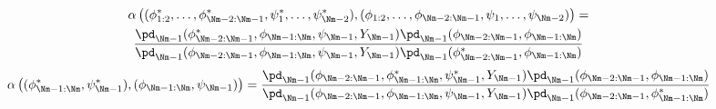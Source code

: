 \begin{multline}
  \alpha\left(
    (\phi_{1:2}^{*}, \ldots, \phi_{\Nm - 2:\Nm - 1}^{*}, \psi_{1}^{*}, \ldots, \psi_{\Nm - 2}^{*}),
    (\phi_{1:2}, \ldots, \phi_{\Nm - 2:\Nm - 1}, \psi_{1}, \ldots, \psi_{\Nm - 2})
  \right)
  = \\
  \frac {
    \pd_{\Nm - 1}(\phi_{\Nm - 2:\Nm - 1}^{*}, \phi_{\Nm - 1:\Nm}, \psi_{\Nm - 1}, Y_{\Nm - 1})
    \pd_{\Nm - 1}(\phi_{\Nm - 2:\Nm - 1}, \phi_{\Nm - 1:\Nm})
  } {
    \pd_{\Nm - 1}(\phi_{\Nm - 2:\Nm - 1}, \phi_{\Nm - 1:\Nm}, \psi_{\Nm - 1}, Y_{\Nm - 1})
    \pd_{\Nm - 1}(\phi_{\Nm - 2:\Nm - 1}^{*}, \phi_{\Nm - 1:\Nm})
  } 
  \end{multline}
  \begin{multline}
  \alpha\left(
    (\phi_{\Nm - 1:\Nm}^{*}, \psi_{\Nm - 1}^{*}),
    (\phi_{\Nm - 1:\Nm}, \psi_{\Nm - 1})
  \right)
  = 
  \frac {
    \pd_{\Nm - 1}(\phi_{\Nm - 2:\Nm - 1}, \phi_{\Nm - 1:\Nm}^{*}, \psi_{\Nm - 1}^{*}, Y_{\Nm - 1})
    \pd_{\Nm - 1}(\phi_{\Nm - 2:\Nm - 1}, \phi_{\Nm - 1:\Nm})
  } {
    \pd_{\Nm - 1}(\phi_{\Nm - 2:\Nm - 1}, \phi_{\Nm - 1:\Nm}, \psi_{\Nm - 1}, Y_{\Nm - 1})
    \pd_{\Nm - 1}(\phi_{\Nm - 2:\Nm - 1}, \phi_{\Nm - 1:\Nm}^{*})
  } 
\end{multline}